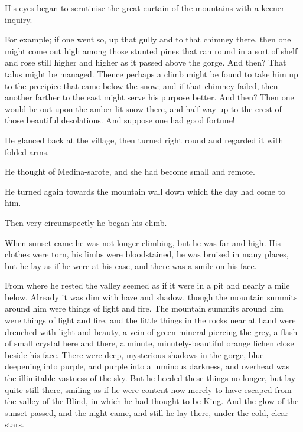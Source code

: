 \documentclass[submission]{sffms}
\begin{document}
His eyes began to scrutinise the great curtain of the mountains with a
keener inquiry.

For example; if one went so, up that gully and to that chimney there,
then one might come out high among those stunted pines that ran round
in a sort of shelf and rose still higher and higher as it passed above
the gorge. And then? That talus might be managed. Thence perhaps a
climb might be found to take him up to the precipice that came below
the snow; and if that chimney failed, then another farther to the east
might serve his purpose better. And then? Then one would be out upon
the amber-lit snow there, and half-way up to the crest of those
beautiful desolations. And suppose one had good fortune!

He glanced back at the village, then turned right round and regarded
it with folded arms.

He thought of Medina-sarote, and she had become small and remote.

He turned again towards the mountain wall down which the day had come
to him.

Then very circumspectly he began his climb.

When sunset came he was not longer climbing, but he was far and
high. His clothes were torn, his limbs were bloodstained, he was
bruised in many places, but he lay as if he were at his ease, and
there was a smile on his face.

From where he rested the valley seemed as if it were in a pit and
nearly a mile below. Already it was dim with haze and shadow, though
the mountain summits around him were things of light and fire. The
mountain summits around him were things of light and fire, and the
little things in the rocks near at hand were drenched with light and
beauty, a vein of green mineral piercing the grey, a flash of small
crystal here and there, a minute, minutely-beautiful orange lichen
close beside his face. There were deep, mysterious shadows in the
gorge, blue deepening into purple, and purple into a luminous
darkness, and overhead was the illimitable vastness of the sky. But he
heeded these things no longer, but lay quite still there, smiling as
if he were content now merely to have escaped from the valley of the
Blind, in which he had thought to be King. And the glow of the sunset
passed, and the night came, and still he lay there, under the cold,
clear stars.
\end{document}
